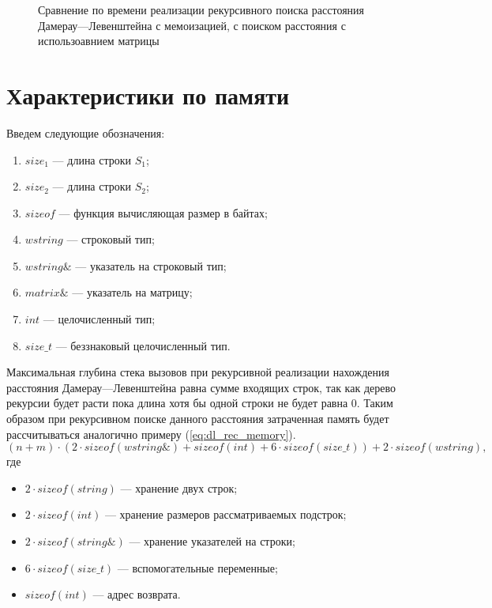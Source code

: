 \begin{figure}[H]
	\centering
	
	\caption{Сравнение по времени реализации рекурсивного поиска расстояния Дамерау---Левенштейна с  мемоизацией, с поиском
	расстояния с использоавнием матрицы}
	\label{plt:time_mat_rec_cmp}
\end{figure}


\section{Характеристики по памяти}

Введем следующие обозначения:
\begin{enumerate}
	\item $size_{1}$ --- длина строки $S_{1}$;
	\item $size_{2}$ --- длина строки $S_{2}$;
	\item $sizeof$ --- функция вычисляющая размер в байтах;
	\item $wstring$ --- строковый тип;
	\item $wstring\&$ --- указатель на строковый тип;
	\item $matrix\&$ --- указатель на матрицу;
	\item $int$ --- целочисленный тип;
	\item $size\_t$ --- беззнаковый целочисленный тип.
\end{enumerate}

Максимальная глубина стека вызовов при рекурсивной реализации нахождения расстояния Дамерау---Левенштейна равна сумме входящих строк,
так как дерево рекурсии будет расти пока длина хотя бы одной строки не будет равна 0. Таким образом при рекурсивном поиске данного расстояния затраченная память
будет рассчитываться  аналогично примеру (\ref{eq:dl_rec_memory}).
\begin{equation}
	\label{eq:dl_rec_memory}
	(n + m) \cdot (2 \cdot sizeof(wstring\&) + sizeof(int) + 6 \cdot sizeof(size\_t)) + 2 \cdot sizeof(wstring),
\end{equation}
где
\begin{itemize}
	\item $2 \cdot sizeof(string)$ --- хранение двух строк;
	\item $2 \cdot sizeof(int)$ --- хранение размеров рассматриваемых подстрок;
	\item $2 \cdot sizeof(string\&)$ --- хранение указателей на строки;
	\item $6 \cdot sizeof(size\_t)$ --- вспомогательные переменные;
	\item $sizeof(int)$ --- адрес возврата.
\end{itemize}

